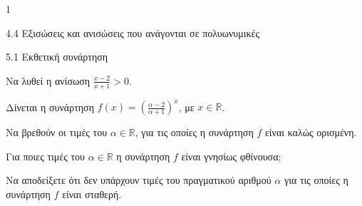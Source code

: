 \begin{ylh}{1}
\item 4.4 Εξισώσεις και ανισώσεις που ανάγονται σε πολυωνυμικές
\item 5.1 Εκθετική συνάρτηση
\end{ylh}
\begin{alist}
\item Να λυθεί η ανίσωση $\frac{x - 2}{x + 1} > 0$.
\item Δίνεται η συνάρτηση $f(x) = \left(\frac{\alpha - 2}{\alpha + 1}\right)^x$, με $x \in \mathbb{R}$.
\begin{rlist}
\item
  Να βρεθούν οι τιμές του $\alpha \in \mathbb{R}$, για τις οποίες η συνάρτηση $f$ είναι καλώς ορισμένη.
\item
  Για ποιες τιμές του $\alpha \in \mathbb{R}$ η συνάρτηση $f$ είναι γνησίως φθίνουσα;
\item
  Να αποδείξετε ότι δεν υπάρχουν τιμές του πραγματικού αριθμού $\alpha$ για τις οποίες η συνάρτηση $f$ είναι σταθερή.
\end{rlist}
\end{alist}

